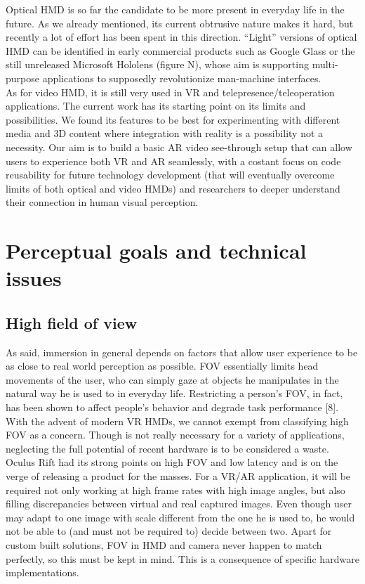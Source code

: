 Optical HMD is so far the candidate to be more present in everyday life in the future. As we already mentioned, its current obtrusive nature makes it hard, but recently a lot of effort has been spent in this direction. “Light” versions of optical HMD can be identified in early commercial products such as Google Glass or the still unreleased Microsoft Hololens (figure N), whose aim is supporting multi-purpose applications to supposedly revolutionize man-machine interfaces.\\
As for video HMD, it is still very used in VR and telepresence/teleoperation applications. The current work has its starting point on its limits and possibilities. We found its features to be best for experimenting with different media and 3D content where integration with reality is a possibility not a necessity. Our aim is to build a basic AR video see-through setup that can allow users to experience both VR and AR seamlessly, with a costant focus on code reusability for future technology development (that will eventually overcome limits of both optical and video HMDs) and researchers to deeper understand their connection in human visual perception.

\section{Perceptual goals and technical issues}
\subsection{High field of view}
As said, immersion in general depends on factors that allow user experience to be as close to real world perception as possible. FOV essentially limits head movements of the user, who can simply gaze at objects he manipulates in the natural way he is used to in everyday life. Restricting a person’s FOV, in fact, has been shown to affect people’s behavior and degrade task performance [8]. With the advent of modern VR HMDs, we cannot exempt from classifying high FOV as a concern. Though is not really necessary for a variety of applications, neglecting the full potential of recent hardware is to be considered a waste. Oculus Rift had its strong points on high FOV and low latency and is on the verge of releasing a product for the masses. For a VR/AR application, it will be required not only working at high frame rates with high image angles, but also filling discrepancies between virtual and real captured images. Even though user may adapt to one image with scale different from the one he is used to, he would not be able to (and must not be required to) decide between two. Apart for custom built solutions, FOV in HMD and camera never happen to match perfectly, so this must be kept in mind. This is a consequence of specific hardware implementations.


